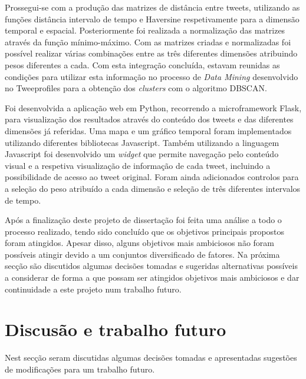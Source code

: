 Prossegui-se com a produção das matrizes de distância entre tweets, utilizando as funções distância intervalo de tempo e Haversine respetivamente para a dimensão temporal e espacial. Posteriormente foi realizada a normalização das matrizes através da função mínimo-máximo. Com as matrizes criadas e normalizadas foi possível realizar várias combinações entre as três diferentes dimensões atribuindo pesos diferentes a cada. Com esta integração concluída, estavam reunidas as condições para utilizar esta informação no processo de \textit{Data Mining} desenvolvido no Tweeprofiles para a obtenção dos \textit{clusters} com o algoritmo DBSCAN.

Foi desenvolvida a aplicação web em Python, recorrendo a microframework Flask, para visualização dos resultados através do conteúdo dos tweets e das diferentes dimensões já referidas. Uma mapa e um gráfico temporal foram implementados utilizando diferentes bibliotecas Javascript. Também utilizando a linguagem Javascript foi desenvolvido um \textit{widget} que permite navegação pelo conteúdo visual e a respetiva visualização de informação de cada tweet, incluindo a possibilidade de acesso ao tweet original. Foram ainda adicionados controlos para a seleção do peso atribuído a cada dimensão e seleção de três diferentes intervalos de tempo.

Após a finalização deste projeto de dissertação foi feita uma análise a todo o processo realizado, tendo sido concluído que os objetivos principais propostos foram atingidos. Apesar disso, alguns objetivos mais ambiciosos não foram possíveis atingir devido a um conjuntos diversificado de fatores. Na próxima secção são discutidos algumas decisões tomadas e sugeridas alternativas possíveis a considerar de forma a que possam ser atingidos objetivos mais ambiciosos e dar continuidade a este projeto num trabalho futuro.

\section{Discusão e trabalho futuro}

Nest secção seram discutidas algumas decisões tomadas e apresentadas sugestões de modificações para um trabalho futuro.

